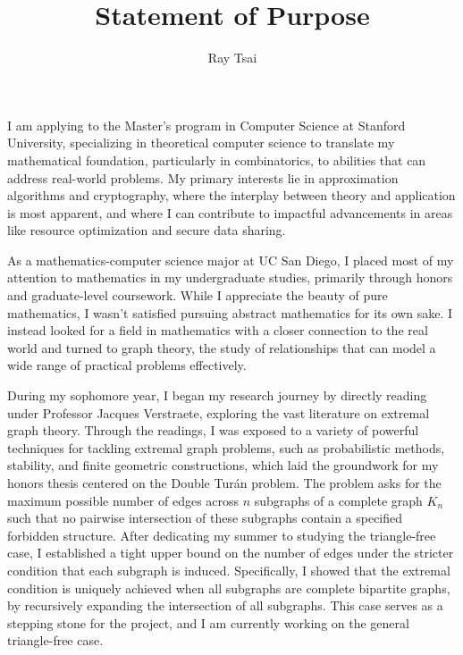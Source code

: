 \documentclass[12pt]{article}
\title{Statement of Purpose}
\author{Ray Tsai}
\date{}
\begin{document}
\maketitle

\vspace{-0.25in}

I am applying to the Master's program in Computer Science at Stanford University, specializing in
theoretical computer science to translate my mathematical foundation, particularly in combinatorics,
to abilities that can address real-world problems. My primary interests lie in approximation
algorithms and cryptography, where the interplay between theory and application is most apparent,
and where I can contribute to impactful advancements in areas like resource optimization and secure
data sharing.

As a mathematics-computer science major at UC San Diego, I placed most of my attention to
mathematics in my undergraduate studies, primarily through honors and graduate-level coursework.
While I appreciate the beauty of pure mathematics, I wasn't satisfied pursuing abstract mathematics
for its own sake. I instead looked for a field in mathematics with a closer connection to the real
world and turned to graph theory, the study of relationships that can model a wide range of
practical problems effectively.

During my sophomore year, I began my research journey by directly reading under Professor Jacques
Verstraete, exploring the vast literature on extremal graph theory. Through the readings, I was
exposed to a variety of powerful techniques for tackling extremal graph problems, such as
probabilistic methods, stability, and finite geometric constructions, which laid the groundwork for
my honors thesis centered on the Double Turán problem. The problem asks for the maximum possible
number of edges across $n$ subgraphs of a complete graph $K_n$ such that no pairwise intersection of
these subgraphs contain a specified forbidden structure. After dedicating my summer to studying the
triangle-free case, I established a tight upper bound on the number of edges under the stricter
condition that each subgraph is induced. Specifically, I showed that the extremal condition is
uniquely achieved when all subgraphs are complete bipartite graphs, by recursively expanding the
intersection of all subgraphs. This case serves as a stepping stone for the project, and I am
currently working on the general triangle-free case. 
\end{document}
